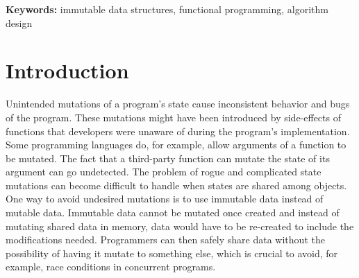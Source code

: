 \documentclass[12pt,twoside]{article}
\begin{document}
\vspace{5mm}

\noindent \textbf{Keywords:} immutable data structures, functional programming, algorithm design

\vspace{4mm}



\newpage
\tableofcontents
\newpage

\setcounter{page}{1}

\newpage
\section{Introduction}
Unintended mutations of a program’s state cause inconsistent behavior and bugs of the
program. These mutations might have been introduced by side-effects of functions that developers
were unaware of during the program’s implementation. Some programming languages do, for example,
allow arguments of a function to be mutated. The fact that a third-party function can mutate the
state of its argument can go undetected. The problem of rogue and complicated state mutations can
become difficult to handle when states are shared among objects. One way to avoid undesired mutations
is to use immutable data instead of mutable data. Immutable data cannot be mutated once created
and instead of mutating shared data in memory, data would have to be re-created to include the modifications
needed. Programmers can then safely share data without the possibility of having it mutate to
something else, which is crucial to avoid, for example, race conditions in concurrent programs.
\end{document}
